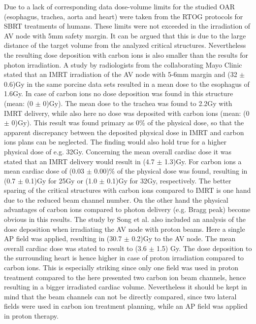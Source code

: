 \documentclass[type=dr, dr=rernat, accentcolor=tud7b,colorbacktitle, bigchapter, openright, twoside, 12pt ]{tudthesis}
\begin{document}
Due to a lack of corresponding data dose-volume limits for the studied OAR (esophagus, trachea, aorta and heart) were taken from the RTOG 
protocols for SBRT treatments of humans. These limits were not exceeded in the irradiation of AV node with 5mm safety margin. 
It can be argued that this is due to the large distance of the target volume from the analyzed critical structures. Nevertheless the resulting 
dose deposition with carbon ions is also smaller than the results for photon irradiation. A study by radiologists from the collaborating 
Mayo Clinic \cite{Son14} stated that an IMRT irradiation of the AV node with 5-6mm margin and (32 $\pm$ 0.6)Gy in the same porcine data sets 
resulted in a mean dose to the esophagus of 1.6Gy. In case of carbon ions no dose deposition was found in this structure (mean: (0 $\pm$ 0)Gy). 
The mean dose to the trachea was found to 2.2Gy with IMRT delivery, while also here no dose was deposited with carbon ions (mean: (0 $\pm$ 0)Gy). 
This result was found primary as 0\% of the physical dose, so that the apparent discrepancy between the deposited physical dose in IMRT 
and carbon ions plans can be neglected. The finding would also hold true for a higher physical dose of e.g. 32Gy. 
Concerning the mean overall cardiac dose it was stated that an IMRT delivery would result in (4.7 $\pm$ 1.3)Gy. For carbon ions a mean 
cardiac dose of (0.03 $\pm$ 0.00)\% of the physical dose was found, resulting in (0.7 $\pm$ 0.1)Gy for 25Gy or (1.0 $\pm$ 0.1)Gy for 32Gy, respectively. 
The better sparing of the critical structures with carbon ions compared to IMRT is one hand due to the reduced beam channel number. 
On the other hand the physical advantages of carbon ions compared to photon delivery (e.g. Bragg peak) become obvious in this results. 
The study by Song et al. also included an analysis of the dose deposition when irradiating the AV node with proton beams. Here a single AP field was 
applied, resulting in (30.7 $\pm$ 0.2)Gy to the AV node. The mean overall cardiac dose was stated to result to (3.6 $\pm$ 1.5) Gy. 
The dose deposition to the surrounding heart is hence higher in case of proton irradiation compared to carbon ions. This is especially striking 
since only one field was used in proton treatment compared to the here presented two carbon ion beam channels, hence resulting in a bigger 
irradiated cardiac volume. Nevertheless it should be kept in mind that the beam channels can not be directly compared, since two lateral 
fields were used in carbon ion treatment planning, while an AP field was applied in proton therapy.\newline
\end{document}
